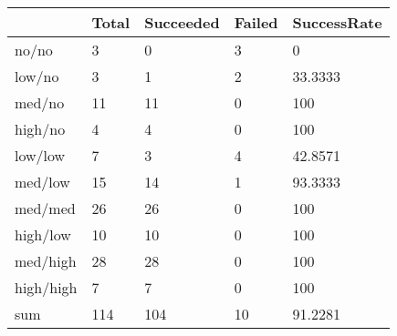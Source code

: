 \begin{tabular}{lllll}
& Total & Succeeded & Failed & SuccessRate \\ 
\hline 
no/no & 3 & 0 & 3 & 0 \\ 
low/no & 3 & 1 & 2 & 33.3333 \\ 
med/no & 11 & 11 & 0 & 100 \\ 
high/no & 4 & 4 & 0 & 100 \\ 
low/low & 7 & 3 & 4 & 42.8571 \\ 
med/low & 15 & 14 & 1 & 93.3333 \\ 
med/med & 26 & 26 & 0 & 100 \\ 
high/low & 10 & 10 & 0 & 100 \\ 
med/high & 28 & 28 & 0 & 100 \\ 
high/high & 7 & 7 & 0 & 100 \\ 
sum & 114 & 104 & 10 & 91.2281 \\ 
\hline 
\end{tabular}
